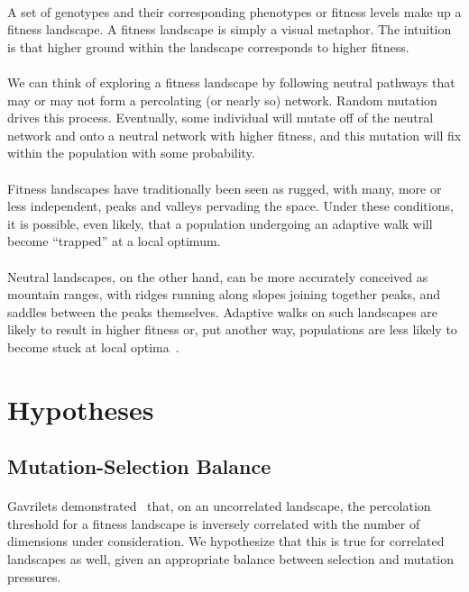 \documentclass[12pt,letterpaper,titlepage,draft]{article}
\begin{document}
\paragraph{}
A set of genotypes and their corresponding phenotypes or fitness levels make up
a fitness landscape. A fitness landscape is simply a visual metaphor. The
intuition is that higher ground within the landscape corresponds to higher
fitness.

\paragraph{}
We can think of exploring a fitness landscape by following neutral pathways
that may or may not form a percolating (or nearly so) network. Random mutation
drives this process.  Eventually, some individual will mutate off of the
neutral network and onto a neutral network with higher fitness, and this
mutation will fix within the population with some probability.

\paragraph{}
Fitness landscapes have traditionally been seen as rugged, with many, more or
less independent, peaks and valleys pervading the space. Under these
conditions, it is possible, even likely, that a population undergoing an
adaptive walk will become ``trapped'' at a local optimum.

\paragraph{}
Neutral landscapes, on the other hand, can be more accurately conceived as
mountain ranges, with ridges running along slopes joining together peaks, and
saddles between the peaks themselves. Adaptive walks on such landscapes are
likely to result in higher fitness or, put another way, populations are less
likely to become stuck at local optima~\cite{Newman1998}.

\section{Hypotheses}

\subsection{Mutation-Selection Balance}

\paragraph{}
Gavrilets demonstrated~\cite{Gavrilets1997} that, on an uncorrelated landscape,
the percolation threshold for a fitness landscape is inversely correlated with
the number of dimensions under consideration. We hypothesize that this is true
for correlated landscapes as well, given an appropriate balance between
selection and mutation pressures.
\end{document}
